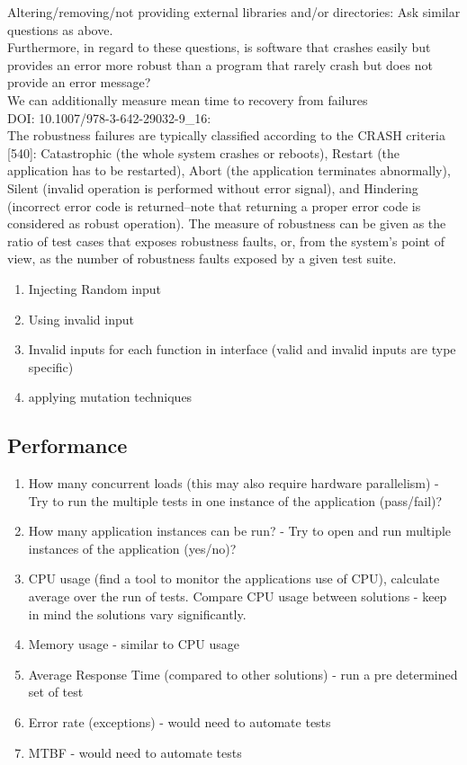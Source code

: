 \documentclass{article}
\begin{document}
Altering/removing/not providing external libraries and/or directories: Ask similar questions as above. \\

Furthermore, in regard to these questions, is software that crashes easily but provides an error more robust than a program that rarely crash but does not provide an error message?\\ 


We can additionally measure mean time to recovery from failures\\  


DOI: 10.1007/978-3-642-29032-9\_16:\\ 
The robustness failures are typically classified according to the CRASH criteria [540]: Catastrophic (the whole system crashes or reboots), Restart (the application has to be restarted), Abort (the application terminates abnormally), Silent (invalid operation is performed without error signal), and Hindering (incorrect error code is returned–note that returning a proper error code is considered as robust operation). The measure of robustness can be given as the ratio of test cases that exposes robustness faults, or, from the system’s point of view, as the number of robustness faults exposed by a given test suite.\\ 

\begin{enumerate}
	\item Injecting Random input 
	\item Using invalid input 
	\item Invalid inputs for each function in interface (valid and invalid inputs are type specific) 
	\item applying mutation techniques 
\end{enumerate}
\subsection{Performance}
\begin{enumerate}
	\item How many concurrent loads (this may also require hardware parallelism) - Try to run the multiple tests in one instance of the application (pass/fail)?
	\item How many application instances can be run? - Try to open and run multiple instances of the application (yes/no)?
	\item CPU usage (find a tool to monitor the applications use of CPU), calculate average over the run of tests. Compare CPU usage between solutions - keep in mind the solutions vary significantly.
	\item Memory usage - similar to CPU usage
	\item Average Response Time (compared to other solutions) - run a pre determined set of test
	\item Error rate (exceptions) - would need to automate tests
	\item MTBF - would need to automate tests
\end{enumerate}
\end{document}
